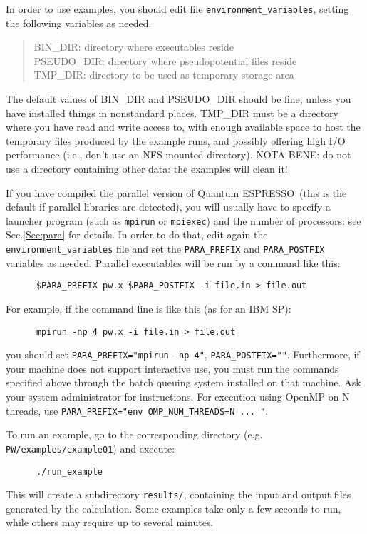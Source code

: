 \documentclass[12pt,a4paper]{article}
\def\qe{{\sc Quantum ESPRESSO}}
\begin{document}
In order to use examples, you should edit file \texttt{environment\_variables},
setting the following variables as needed.
\begin{quote}
   BIN\_DIR: directory where executables reside\\
   PSEUDO\_DIR: directory where pseudopotential files reside\\
   TMP\_DIR: directory to be used as temporary storage area
\end{quote}
The default values of BIN\_DIR and PSEUDO\_DIR should be fine,
unless you have installed things in nonstandard places. TMP\_DIR
must be a directory where you have read and write access to, with
enough available space to host the temporary files produced by the
example runs, and possibly offering high I/O performance (i.e., don't
use an NFS-mounted directory). NOTA BENE: do not use a
directory containing other data: the examples will clean it!

If you have compiled the parallel version of \qe\ (this
is the default if parallel libraries are detected), you will usually
have to specify a launcher program (such as \texttt{mpirun} or
\texttt{mpiexec}) and the number of processors: see Sec.\ref{Sec:para} for
details. In order to do that, edit again the \texttt{environment\_variables}
file and set the \texttt{PARA\_PREFIX} and \texttt{PARA\_POSTFIX} variables
as needed. Parallel executables will be run by a command like this:
\begin{verbatim}
      $PARA_PREFIX pw.x $PARA_POSTFIX -i file.in > file.out
\end{verbatim}
For example, if the command line is like this (as for an IBM SP):
\begin{verbatim}
      mpirun -np 4 pw.x -i file.in > file.out
\end{verbatim}
you should set \texttt{PARA\_PREFIX="mpirun -np 4"},
\texttt{PARA\_POSTFIX=""}.
Furthermore, if your machine does not support interactive use, you
must run the commands specified above through the batch queuing
system installed on that machine. Ask your system administrator for
instructions. For execution using OpenMP on N threads,
use \texttt{PARA\_PREFIX="env OMP\_NUM\_THREADS=N ... "}.

To run an example, go to the corresponding directory (e.g.
 \texttt{PW/examples/example01}) and execute:
\begin{verbatim}
      ./run_example
\end{verbatim}
This will create a subdirectory \texttt{results/}, containing the input and
output files generated by the calculation. Some examples take only a
few seconds to run, while others may require up to several minutes.
\end{document}
